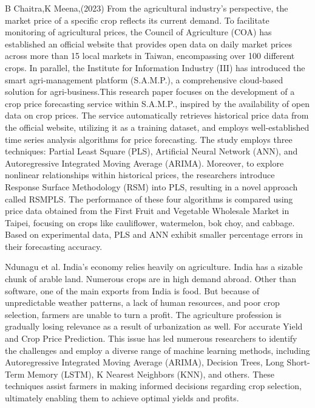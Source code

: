         B Chaitra,K Meena,(2023) \cite{chaitra2023} From the agricultural industry's perspective, the market price of a specific crop reflects its current demand. To facilitate monitoring of agricultural prices, the Council of Agriculture (COA) has established an official website that provides open data on daily market prices across more than 15 local markets in Taiwan, encompassing over 100 different crops. In parallel, the Institute for Information Industry (III) has introduced the smart agri-management platform (S.A.M.P.), a comprehensive cloud-based solution for agri-business.This research paper focuses on the development of a crop price forecasting service within S.A.M.P., inspired by the availability of open data on crop prices. The service automatically retrieves historical price data from the official website, utilizing it as a training dataset, and employs well-established time series analysis algorithms for price forecasting. The study employs three techniques: Partial Least Square (PLS), Artificial Neural Network (ANN), and Autoregressive Integrated Moving Average (ARIMA). Moreover, to explore nonlinear relationships within historical prices, the researchers introduce Response Surface Methodology (RSM) into PLS, resulting in a novel approach called RSMPLS. The performance of these four algorithms is compared using price data obtained from the First Fruit and Vegetable Wholesale Market in Taipei, focusing on crops like cauliflower, watermelon, bok choy, and cabbage. Based on experimental data, PLS and ANN exhibit smaller percentage errors in their forecasting accuracy.
        
        Ndunagu et al. \cite{ndunagu2022} India's economy relies heavily on agriculture. India has a sizable chunk of arable land. Numerous crops are in high demand abroad. Other than software, one of the main exports from India is food. But because of unpredictable weather patterns, a lack of human resources, and poor crop selection, farmers are unable to turn a profit. The agriculture profession is gradually losing relevance as a result of urbanization as well. For accurate Yield and Crop Price Prediction. This issue has led numerous researchers to identify the challenges and employ a diverse range of machine learning methods, including Autoregressive Integrated Moving Average (ARIMA), Decision Trees, Long Short-Term Memory (LSTM), K Nearest Neighbors (KNN), and others. These techniques assist farmers in making informed decisions regarding crop selection, ultimately enabling them to achieve optimal yields and profits.
        
